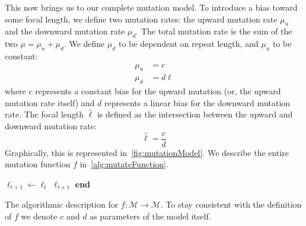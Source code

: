 This now brings us to our complete mutation model.
To introduce a bias toward some focal length, we define two mutation rates: the upward mutation rate $\mu_u$ and the
downward mutation rate $\mu_d$.
The total mutation rate is the sum of the two $\mu = \mu_u + \mu_d$.
We define $\mu_d$ to be dependent on repeat length, and $\mu_u$ to be constant:
\begin{align}
    \mu_u &= c \\
    \mu_d &= d\ell
\end{align}
where $c$ represents a constant bias for the upward mutation (or, the upward mutation rate itself) and $d$ represents a
linear bias for the downward mutation rate.
The focal length $\hat{\ell}$ is defined as the intersection between the upward and downward mutation rate:
\begin{equation}
    \hat{\ell} = \frac{c}{d}
\end{equation}
Graphically, this is represented in~\autoref{fig:mutationModel}.
We describe the entire mutation function $f$ in~\autoref{alg:mutateFunction}.

\begin{algorithm}[t]
    \SetAlgoLined
    \DontPrintSemicolon
     {
        $\ell_{t+1} \gets \ell_t$ \;
        \Return $\ell_{t+1}$ \;
    }
    \textbf{end} \;
    \caption{The algorithmic description for $f: \mathcal{M} \rightarrow \mathcal{M}$.
    To stay consistent with the definition of $f$ we denote $c$ and $d$ as parameters of the model itself.}
    \label{alg:mutateFunction}
\end{algorithm}
